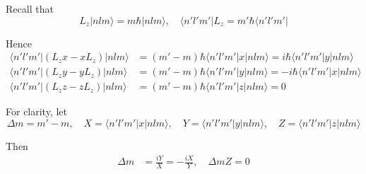


Recall that
\begin{equation*}
L_z|nlm\rangle=m\hbar|nlm\rangle,\quad
\langle n'l'm'|L_z=m'\hbar\langle n'l'm'|
\end{equation*}

Hence
\begin{align*}
\langle n'l'm'|(L_zx-xL_z)|nlm\rangle
&=(m'-m)\hbar\langle n'l'm'|x|nlm\rangle=i\hbar\langle n'l'm'|y|nlm\rangle
\\
\langle n'l'm'|(L_zy-yL_z)|nlm\rangle
&=(m'-m)\hbar\langle n'l'm'|y|nlm\rangle=-i\hbar\langle n'l'm'|x|nlm\rangle
\\
\langle n'l'm'|(L_zz-zL_z)|nlm\rangle
&=(m'-m)\hbar\langle n'l'm'|z|nlm\rangle=0
\end{align*}

For clarity, let
\begin{equation*}
\Delta m=m'-m,\quad X=\langle n'l'm'|x|nlm\rangle,\quad
Y=\langle n'l'm'|y|nlm\rangle,\quad Z=\langle n'l'm'|z|nlm\rangle
\end{equation*}

Then
\begin{align*}
\Delta m&=\frac{iY}{X}=-\frac{iX}{Y},\quad\Delta mZ=0
\end{align*}



